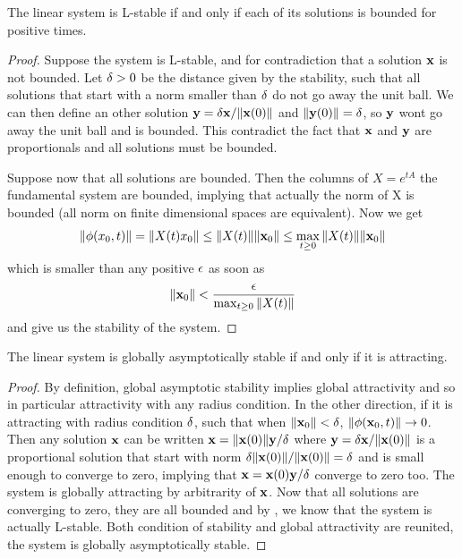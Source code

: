  \begin{theoreme} \label{th:stablecondition}
     The linear system is L-stable if and only if each of its solutions is bounded for positive times.
 \end{theoreme}
 \begin{proof}
  Suppose the system is L-stable, and for contradiction that a solution $\mathbf{x}$ is not bounded. Let $\delta>0$ be the distance given by the stability, such that all solutions that start with a norm smaller than $\delta$ do not go away the unit ball. We can then define an other solution $\mathbf{y}=\delta\mathbf{x}/\|\mathbf{x}(0)\|$ and $\|\mathbf{y}(0)\|=\delta$, so $\mathbf{y}$ wont go away the unit ball and is bounded. This contradict the fact that $\mathbf{x}$ and $\mathbf{y}$ are proportionals and all solutions must be bounded.
  
  Suppose now that all solutions are bounded. Then the columns of $X=e^{tA}$ the fundamental system are bounded, implying that actually the norm of X is bounded (all norm on finite dimensional spaces are equivalent). Now we get 
  \[ \|\phi(x_0,t)\|=\|X(t)x_0\| 
  \leq \|X(t)\| \|\mathbf{x}_0\| 
  \leq \max_{t\geq0} \|X(t)\| \|\mathbf{x}_0\| \]
  which is smaller than any positive $\epsilon$ as soon as 
  $$\|\mathbf{x}_0\| < \frac{\epsilon}{\max_{t\geq0} \|X(t)\|}$$
  and give us the stability of the system.
 \end{proof}
\begin{theoreme}
    The linear system is globally asymptotically stable if and only if it is attracting.
\end{theoreme}
\begin{proof}
By definition, global asymptotic stability implies global attractivity and so in particular attractivity with any radius condition. In the other direction, if it is attracting with radius condition $\delta$, such that when $\|\mathbf{x}_0\|<\delta$, $\|\phi(\mathbf{x}_0,t)\|\to0$. Then any solution $\mathbf{x}$ can be written $\mathbf{x}=\|\mathbf{x}(0)\|\mathbf{y}/\delta$ where $\mathbf{y}=\delta\mathbf{x}/\|\mathbf{x}(0)\|$ is a proportional solution that start with norm $\delta\|\mathbf{x}(0)\|/\|\mathbf{x}(0)\|=\delta$ and is small enough to converge to zero, implying that $\mathbf{x}=\mathbf{x}(0)\mathbf{y}/\delta$ converge to zero too. The system is globally attracting by arbitrarity of $\mathbf{x}$. Now that all solutions are converging to zero, they are all bounded and by , we know that the system is actually L-stable. Both condition of stability and global attractivity are reunited, the system is globally asymptotically stable.
\end{proof}

